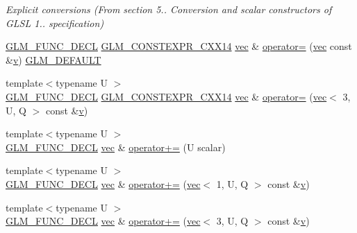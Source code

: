 \begin{DoxyCompactItemize}
\begin{DoxyCompactList}\small\item\em Explicit conversions (From section 5.. Conversion and scalar constructors of G\+L\+SL 1.. specification) \end{DoxyCompactList}\item 
\mbox{\hyperlink{setup_8hpp_ab2d052de21a70539923e9bcbf6e83a51}{G\+L\+M\+\_\+\+F\+U\+N\+C\+\_\+\+D\+E\+CL}} \mbox{\hyperlink{setup_8hpp_a4dd12abf5e1164bc57f3a34671d03844}{G\+L\+M\+\_\+\+C\+O\+N\+S\+T\+E\+X\+P\+R\+\_\+\+C\+X\+X14}} \mbox{\hyperlink{structglm_1_1vec}{vec}} \& \mbox{\hyperlink{structglm_1_1vec_3_013_00_01_t_00_01_q_01_4_ab955dba2c50085c9e1b3f6b0daa36fcc}{operator=}} (\mbox{\hyperlink{structglm_1_1vec}{vec}} const \&\mbox{\hyperlink{_s_d_l__opengl_8h_a10a82eabcb59d2fcd74acee063775f90}{v}}) \mbox{\hyperlink{setup_8hpp_aefce7051c376a64ba89fa93a9f63bc2c}{G\+L\+M\+\_\+\+D\+E\+F\+A\+U\+LT}}
\item 
{\footnotesize template$<$typename U $>$ }\\\mbox{\hyperlink{setup_8hpp_ab2d052de21a70539923e9bcbf6e83a51}{G\+L\+M\+\_\+\+F\+U\+N\+C\+\_\+\+D\+E\+CL}} \mbox{\hyperlink{setup_8hpp_a4dd12abf5e1164bc57f3a34671d03844}{G\+L\+M\+\_\+\+C\+O\+N\+S\+T\+E\+X\+P\+R\+\_\+\+C\+X\+X14}} \mbox{\hyperlink{structglm_1_1vec}{vec}} \& \mbox{\hyperlink{structglm_1_1vec_3_013_00_01_t_00_01_q_01_4_a10cb43cfab9dbc66022f9bd5c121b694}{operator=}} (\mbox{\hyperlink{structglm_1_1vec}{vec}}$<$ 3, U, Q $>$ const \&\mbox{\hyperlink{_s_d_l__opengl_8h_a10a82eabcb59d2fcd74acee063775f90}{v}})
\item 
{\footnotesize template$<$typename U $>$ }\\\mbox{\hyperlink{setup_8hpp_ab2d052de21a70539923e9bcbf6e83a51}{G\+L\+M\+\_\+\+F\+U\+N\+C\+\_\+\+D\+E\+CL}} \mbox{\hyperlink{structglm_1_1vec}{vec}} \& \mbox{\hyperlink{structglm_1_1vec_3_013_00_01_t_00_01_q_01_4_a342066932ae10cf28589b8cd845edb7c}{operator+=}} (U scalar)
\item 
{\footnotesize template$<$typename U $>$ }\\\mbox{\hyperlink{setup_8hpp_ab2d052de21a70539923e9bcbf6e83a51}{G\+L\+M\+\_\+\+F\+U\+N\+C\+\_\+\+D\+E\+CL}} \mbox{\hyperlink{structglm_1_1vec}{vec}} \& \mbox{\hyperlink{structglm_1_1vec_3_013_00_01_t_00_01_q_01_4_a63f2591742e886ac84b03e2ad7157b2f}{operator+=}} (\mbox{\hyperlink{structglm_1_1vec}{vec}}$<$ 1, U, Q $>$ const \&\mbox{\hyperlink{_s_d_l__opengl_8h_a10a82eabcb59d2fcd74acee063775f90}{v}})
\item 
{\footnotesize template$<$typename U $>$ }\\\mbox{\hyperlink{setup_8hpp_ab2d052de21a70539923e9bcbf6e83a51}{G\+L\+M\+\_\+\+F\+U\+N\+C\+\_\+\+D\+E\+CL}} \mbox{\hyperlink{structglm_1_1vec}{vec}} \& \mbox{\hyperlink{structglm_1_1vec_3_013_00_01_t_00_01_q_01_4_af225b4b2d835609198480cd692c088d8}{operator+=}} (\mbox{\hyperlink{structglm_1_1vec}{vec}}$<$ 3, U, Q $>$ const \&\mbox{\hyperlink{_s_d_l__opengl_8h_a10a82eabcb59d2fcd74acee063775f90}{v}})

\end{DoxyCompactItemize}
